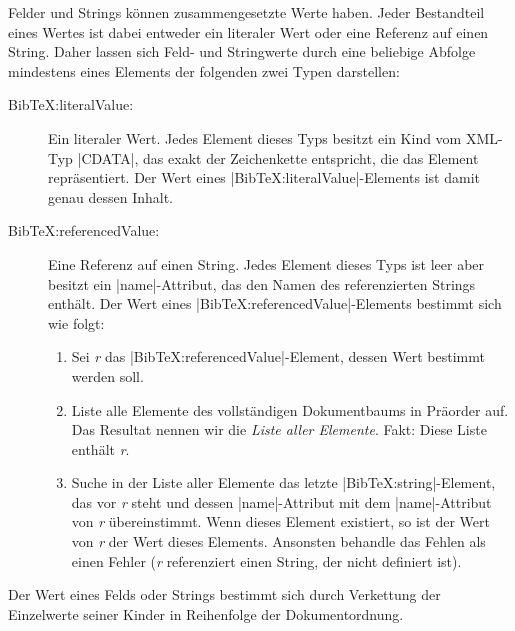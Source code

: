 Felder und Strings können zusammengesetzte Werte haben. Jeder Bestandteil eines
Wertes ist dabei entweder ein literaler Wert oder eine Referenz auf einen
String. Daher lassen sich Feld- und Stringwerte durch eine beliebige Abfolge
mindestens eines Elements der folgenden zwei Typen darstellen:
\begin{description}
    \item[\ttfamily BibTeX:literalValue:] Ein literaler Wert. Jedes
        Element dieses Typs besitzt ein Kind vom XML-Typ \lstinlineXML|CDATA|,
        das exakt der Zeichenkette entspricht, die das Element repräsentiert.
        Der Wert eines \mbox{\lstinlineXML|BibTeX:literalValue|-}Elements ist
        damit genau dessen Inhalt.
    \item[\ttfamily BibTeX:referencedValue:] Eine Referenz auf einen
        String. Jedes Element dieses Typs ist leer aber besitzt ein
        \mbox{\lstinlineXML|name|-}Attribut, das den Namen des referenzierten
        Strings enthält. Der Wert eines
        \mbox{\lstinlineXML|BibTeX:referencedValue|-}Elements bestimmt sich wie
        folgt:
        \begin{enumerate}
            \item Sei \textit{r} das
                \mbox{\lstinlineXML|BibTeX:referencedValue|-}Element, dessen
                Wert bestimmt werden soll.
            \item Liste alle Elemente des vollständigen Dokumentbaums in
                Präorder auf. Das Resultat nennen wir die \textit{Liste aller
                Elemente}. Fakt: Diese Liste enthält \textit{r}.
            \item Suche in der Liste aller Elemente das letzte
                \mbox{\lstinlineXML|BibTeX:string|-}Element, das vor \textit{r}
                steht und dessen \mbox{\lstinlineXML|name|-}Attribut mit dem
                \mbox{\lstinlineXML|name|-}Attribut von \textit{r}
                übereinstimmt. Wenn dieses Element existiert, so ist der Wert
                von \textit{r} der Wert dieses Elements. Ansonsten behandle das
                Fehlen als einen Fehler (\textit{r} referenziert einen String,
                der nicht definiert ist).
        \end{enumerate}
\end{description}
Der Wert eines Felds oder Strings bestimmt sich durch Verkettung der Einzelwerte
seiner Kinder in Reihenfolge der Dokumentordnung.